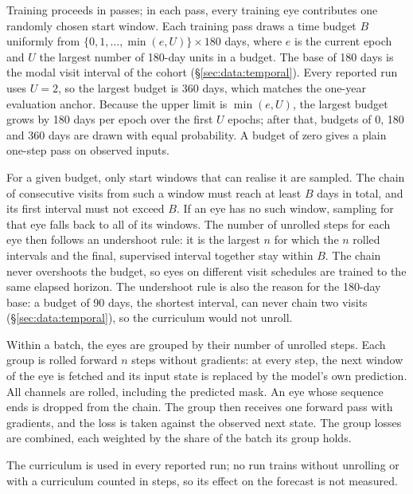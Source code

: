 Training proceeds in passes; in each pass, every training eye contributes
one randomly chosen start window. Each training pass draws a time budget
$B$ uniformly from $\{0, 1, \dots, \min(e, U)\} \times 180$ days, where $e$
is the current epoch and $U$ the largest number of 180-day units in a
budget. The base of 180 days is the modal visit interval of the cohort
(\S\ref{sec:data:temporal}). Every reported run uses $U = 2$, so the
largest budget is 360 days, which matches the one-year evaluation anchor.
Because the upper limit is $\min(e, U)$, the largest budget grows by 180
days per epoch over the first $U$ epochs; after that, budgets of 0, 180 and
360 days are drawn with equal probability. A budget of zero gives a plain one-step pass on observed
inputs.

For a given budget, only start windows that can realise it are sampled.
The chain of consecutive visits from such a window must reach at least $B$
days in total, and its first interval must not exceed $B$. If an eye has no
such window, sampling for that eye falls back to all of its windows.
The number of unrolled steps for each eye then follows an undershoot rule:
it is the largest $n$ for which the $n$ rolled intervals and the final,
supervised interval together stay within $B$. The chain never overshoots
the budget, so eyes on different visit schedules are trained to the same
elapsed horizon. The undershoot rule is also the reason for the 180-day
base: a budget of 90 days, the shortest interval, can never chain two
visits (\S\ref{sec:data:temporal}), so the curriculum would not unroll.

Within a batch, the eyes are grouped by their number of unrolled steps.
Each group is rolled forward $n$ steps without gradients: at every step,
the next window of the eye is fetched and its input state is replaced by
the model's own prediction. All channels are rolled, including the
predicted mask. An eye whose sequence ends is dropped from the chain. The
group then receives one forward pass with gradients, and the loss is taken
against the observed next state. The group losses are combined, each
weighted by the share of the batch its group holds.

The curriculum is used in every reported run; no run trains without
unrolling or with a curriculum counted in steps, so its effect on the
forecast is not measured.

